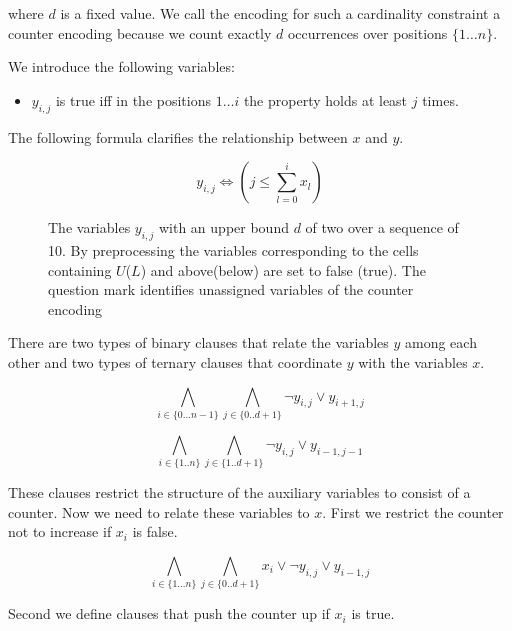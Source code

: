 \documentclass[]{llncs}
\begin{document}
where $d$ is a fixed value.  We call the encoding for such a cardinality
constraint a counter encoding because we count exactly $d$ occurrences
over positions $\{1\ldots n\}$. 

We introduce the following variables: 

\begin{itemize}
    \item $y_{i,j}$ is true iff in the positions $1 \ldots i$ the
        property holds at least $j$ times.        
\end{itemize}

The following formula clarifies the relationship between $x$ and $y$.

$$ y_{i,j} \iff (j \leq \sum_{l=0}^{i} x_{l}) $$


\begin{figure}
\centering 
\caption{The variables $y_{i,j}$ with an upper bound $d$ of two over a
    sequence of 10. By preprocessing the variables corresponding to the
    cells containing $U$($L$) and above(below) are set to false (true).
    The question mark identifies unassigned variables of the counter
    encoding}
%
\end{figure}

There are two types of binary clauses that relate the variables $y$ among
each other and two types of ternary clauses that coordinate $y$ with the
variables $x$.

\begin{equation}
    \bigwedge_{i \in \{0\ldots n-1\}} \bigwedge_{j \in\{0..d+1\}}
    \neg y_{i,j} \vee y_{i+1,j}
\end{equation}

\begin{equation}
    \bigwedge_{i \in \{1..n\}} \bigwedge_{j\in \{1..d+1\}}
    \neg y_{i,j} \vee y_{i-1,j-1}
\end{equation}

These clauses restrict the structure of the auxiliary variables to
consist of a counter. Now we need to relate these variables to $x$. 
First we restrict the counter not to increase if $x_{i}$ is
false. 


\begin{equation}
    \bigwedge_{i \in \{1\ldots n\}} \bigwedge_{j\in\{0..d+1\}}
    x_{i} \vee \neg y_{i,j} \vee y_{i-1,j}
\end{equation}

Second we define clauses that push  the counter up if $x_i$ is true. 
\end{document}
